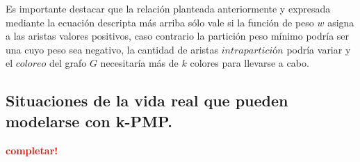 Es importante destacar que la relación planteada anteriormente y expresada mediante 
la ecuación descripta más arriba sólo vale si la función de peso $w$ asigna a las 
aristas valores positivos, caso contrario la partición peso mínimo podría ser una 
cuyo peso sea negativo, la cantidad de aristas $intrapartición$ podría variar y el 
$coloreo$ del grafo $G$ necesitaría más de $k$ colores para llevarse a cabo.



\newpage
\subsection{Situaciones de la vida real que pueden modelarse con k-PMP.}
\vspace*{0.3cm}
\textcolor{red}{\textbf{completar!}}

